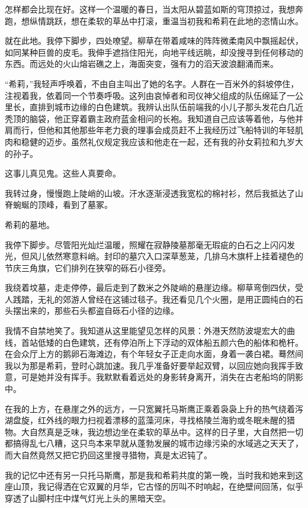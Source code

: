 \documentclass[AutoFakeBold=true]{book}
\begin{document}
怎样都会比现在好。这样一个温暖的春日，当太阳从碧蓝如斯的穹顶掠过，我想奔跑，想纵情跳跃，想在柔软的草丛中打滚，重温当初我和希莉在此地的恣情山水。

就在此地。我停下脚步，四处嘹望。柳草在带着咸味的阵阵微柔南风中飘摇起伏，如同某种巨兽的皮毛。我伸手遮挡住阳光，向地平线远眺，却没搜寻到任何移动的东西。而远处的火山熔岩礁之上，海面突变，强有力的滔天波浪翻涌而来。

``希莉，''我轻声呼唤着，不由自主叫出了她的名字。人群在一百米外的斜坡停住，注视着我，依着同一个节奏呼吸。这列由哀悼者和司仪神父组成的队伍绵延了一公里长，直排到城市边缘的白色建筑。我辨认出队伍前端我的小儿子那头发花白几近秃顶的脑袋，他正穿着霸主政府蓝金相问的长袍。我知道自己应该等着他，与他并肩而行，但他和其他那些年老力衰的理事会成员赶不上我经历过飞船特训的年轻肌肉和稳健的迈步。虽然礼仪规定我应该和他走在一起，还有我的孙女莉拉和九岁大的孙子。

这事儿真见鬼。这些人真要命。

我转过身，慢慢跑上陡峭的山坡。汗水逐渐浸透我宽松的棉衬衫，然后我抵达了山脊蜿蜒的顶峰，看到了墓冢。

{\kaishu 希莉的墓地。}

我停下脚步。尽管阳光灿烂温暖，照耀在寂静陵墓那毫无瑕疵的白石之上闪闪发光，但风儿依然寒意料峭。封印的墓穴入口深草葱茏，几排乌木旗杆上挂着褪色的节庆三角旗，它们排列在狭窄的砾石小径旁。

我绕着坟墓，走走停停，最后走到了数米之外陡峭的悬崖边缘。柳草弯倒四伏，受人践踏，无礼的郊游人曾经在这铺过毯子。我还看见几个火圈，是用正圆纯白的石头摆出来的，那些石头都盗自砾石小径的边缘。

我情不自禁地笑了。我知道从这里能望见怎样的风景：外港天然防波堤宏大的曲线，首站低矮的白色建筑，还有停泊所上下浮动的双体船五颜六色的船体和桅杆。在会众厅上方的鹅卵石海滩边，有个年轻女子正走向水面，身着一袭白裙。蓦然间我以为那是希莉，登时心跳加速。我几乎准备好要举起双臂，以回应她向我挥手致意，可是她并没有挥手。我默默看着远处的身影转身离开，消失在古老船坞的阴影中。

在我的上方，在悬崖之外的远方，一只宽翼托马斯鹰正乘着袅袅上升的热气绕着泻湖盘旋，红外线的眼力扫视着漂移的蓝藻河床，寻找格陵兰海豹或冬眠未醒的猎物。大自然真是乏味，我边想边坐在柔软的草丛中。这样的日子里，大自然把一切都搞得乱七八糟，这只鸟本来早就从蓬勃发展的城市边缘污染的水域逃之天天了，而大自然竟然又把它扔回这里搜寻猎物，真是太迟钝了。

我的记忆中还有另一只托马斯鹰，那是我和希莉共度的第一晚，当时我和她来到这座山顶，我记得洒在它双翼的月华，它古怪的厉叫不时响起，在绝壁间回荡，似乎穿透了山脚村庄中煤气灯光上头的黑暗天空。
\end{document}

